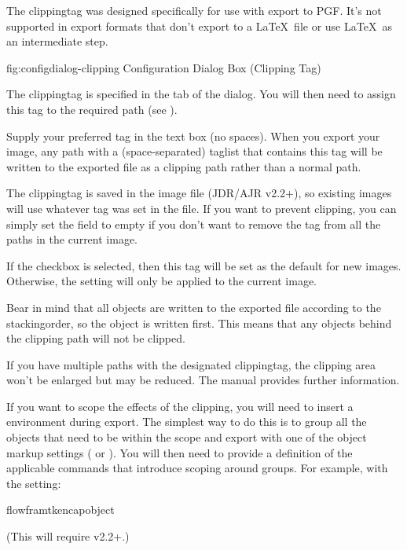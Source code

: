 The \gls{clippingtag} was designed specifically for use with export
to PGF. It's not supported in export formats that don't export to 
a \LaTeX\ file or use \LaTeX\ as an intermediate step.

\FloatFig
  {fig:configdialog-clipping}
  {}
  {Configuration Dialog Box (Clipping Tag)}


The \gls{clippingtag} is specified in the  tab of the
 dialog. You will then need to assign this tag to the
required \gls{path} (see ).


Supply your preferred tag in the  text box (no
spaces). When you export your image, any \gls{path} with a
(space-separated) \gls{taglist} that contains this tag will be written to
the exported file as a clipping path rather than a normal path.

The \gls{clippingtag} is saved in the image file (\gls{JDR}\slash\gls{AJR}
v2.2+), so existing images will use whatever tag was set in the
file. If you want to prevent clipping, you can simply set the
 field to empty if you don't want to remove the
tag from all the \glspl{path} in the current image.

If the  checkbox is selected, then
this tag will be set as the default for new images. Otherwise, the
setting will only be applied to the current image.

Bear in mind that all \glspl{object} are written to the exported file 
according to the \gls{stackingorder}, so the  
object is written first. This means that any
objects behind the clipping path will not be clipped.

\begin{information}
If you have multiple paths with the designated \gls{clippingtag}, the clipping area won't
be enlarged but may be reduced. The  manual provides further information.
\end{information}

If you want to scope the effects of the clipping, you will need to
insert a  environment during export. The simplest way to do this is
to group all the objects that need to be within the scope and export
with one of the object markup settings 
( or ).
You will then need to provide a definition of the applicable
commands that introduce scoping around groups.
For example, with the  setting:
\begin{codebox}
\gls{flowframtkencapobject}
\end{codebox}
(This will require  v2.2+.)

